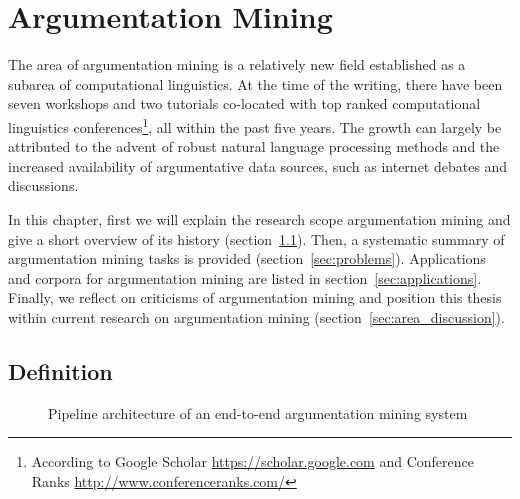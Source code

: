 \chapter{Argumentation Mining}
\label{chap:argmin}

The area of argumentation mining is a relatively new field established as a
subarea of computational linguistics.  At the time of the writing, there have
been seven workshops and two tutorials co-located with top ranked computational
linguistics conferences\footnote{According to Google Scholar
\url{https://scholar.google.com} and Conference Ranks
\url{http://www.conferenceranks.com/}}, all within the past five years. The
growth can largely be attributed to the advent of robust natural language
processing methods and the increased availability of argumentative data sources,
such as internet debates and discussions. 

In this chapter, first we will explain the research scope argumentation
mining and give a short overview of its history (section~\ref{sec:definition}).
Then, a systematic summary of argumentation mining tasks is provided
(section~\ref{sec:problems}). Applications and corpora for argumentation mining 
are listed in section~\ref{sec:applications}. 
Finally, we reflect on criticisms of argumentation mining
and position this thesis within current research on argumentation mining
(section~\ref{sec:area_discussion}).

\section{Definition}
\label{sec:definition}

\begin{figure}[t]
	\caption{Pipeline architecture of an end-to-end argumentation mining 
	system}
	\label{fig:pipeline}
\end{figure}


